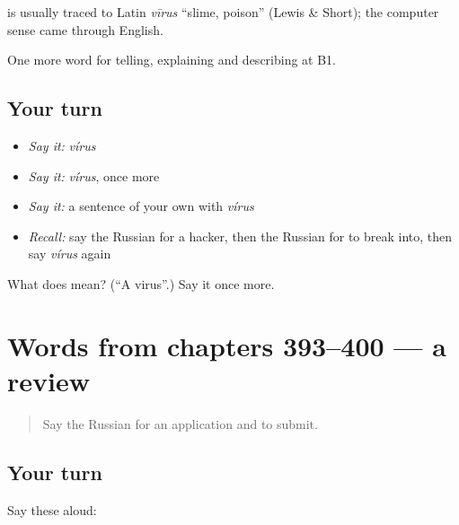\begin{cousinweb}
\textbf{} is usually traced to Latin \emph{vīrus} \textquotedblleft{}slime, poison\textquotedblright{} (Lewis \& Short); the computer sense came through English.
\end{cousinweb}

\begin{grammarlens}[title={What you've built}]
One more word for telling, explaining and describing at B1.
\end{grammarlens}

\subsection*{Your turn}
\begin{itemize}
\raggedright
  \item \emph{Say it:} \emph{vírus}
  \item \emph{Say it:} \emph{vírus}, once more
  \item \emph{Say it:} a sentence of your own with \emph{vírus}
  \item \emph{Recall:} say the Russian for a hacker, then the Russian for to break into, then say \emph{vírus} again
\end{itemize}

\begin{tcolorbox}[breakable,colback=teal!4,colframe=teal!35!black,title={Before you move on}]
What does  mean? (\textquotedblleft{}A virus\textquotedblright{}.) Say it once more.
\end{tcolorbox}
\section[(dialogue)]{Words from chapters 393–400 — a review}

\label{lesson:RU-R400-review-393-400}



\begin{quote}
Say the Russian for an application and to submit.
\end{quote}

\subsection*{Your turn}
Say these aloud:

